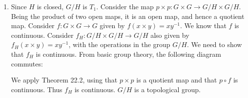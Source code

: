 \begin{enumerate}
\item Since $H$ is closed, $G/H$ is $T_1$. Consider the map $p \times p : G \times G \to G/H \times G/H$. Being the product of two open maps, it is an open map, and hence a quotient map. Consider $f : G \times G \to G$ given by $f(x \times y) = xy^{-1}$. We know that $f$ is continuous. Consider $f_H : G/H \times G/H \to G/H$ also given by $f_H(x \times y) = xy^{-1}$, with the operations in the group $G/H$. We need to show that $f_H$ is continuous. From basic group theory, the following diagram commutes:
\begin{center}
\end{center}
We apply Theorem 22.2, using that $p \times p$ is a quotient map and that $p \circ f$ is continuous. Thus $f_H$ is continuous. $G/H$ is a topological group.

\end{enumerate}

